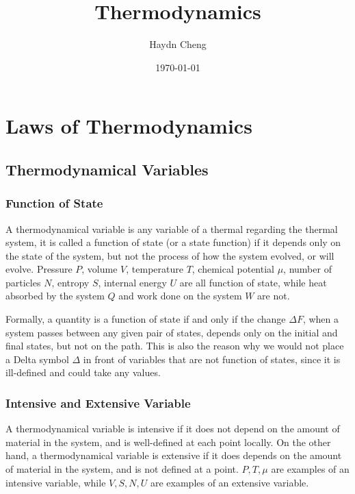 \documentclass[english,a4paper,12pt]{report}
\title{Thermodynamics}
\author{Haydn Cheng}
\date{\today}
\begin{document}
\maketitle
\tableofcontents
    
\chapter{Laws of Thermodynamics}

\section{Thermodynamical Variables}

\subsection{Function of State}

A thermodynamical variable is any variable of a thermal regarding the thermal system, it is called a function of state (or a state function) if it depends only on the state of the system, but not the process of how the system evolved, or will evolve. Pressure \(P\), volume \(V\), temperature \(T\), chemical potential \(\mu \), number of particles \(N\), entropy \(S\), internal energy \(U\) are all function of state, while heat absorbed by the system \(Q\) and work done on the system \(W\) are not.

Formally, a quantity is a function of state if and only if the change \(\Delta F\), when a system passes between any given pair of states, depends only on the initial and final states, but not on the path. This is also the reason why we would not place a Delta symbol \(\Delta \) in front of variables that are not function of states, since it is ill-defined and could take any values.

\subsection{Intensive and Extensive Variable}

A thermodynamical variable is intensive if it does not depend on the amount of material in the system, and is well-defined at each point locally. On the other hand, a thermodynamical variable is extensive if it does depends on the amount of material in the system, and is not defined at a point. \(P,T,\mu \) are examples of an intensive variable, while \(V,S,N,U\) are examples of an extensive variable. 
\end{document}
